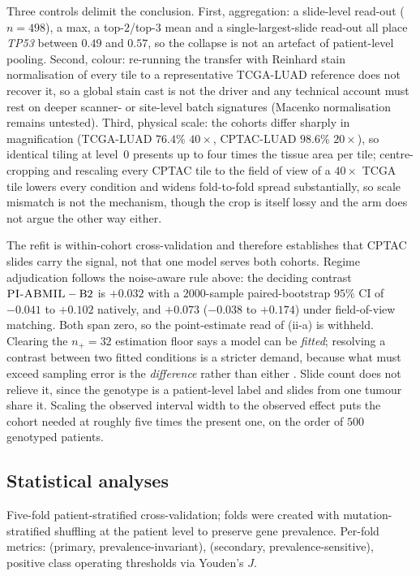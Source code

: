 Three controls delimit the conclusion. First, aggregation: a slide-level
read-out ($n\!=\!498$), a max, a top-$2$/top-$3$ mean and a
single-largest-slide read-out all place \textit{TP53} between $0.49$ and
$0.57$, so the collapse is not an artefact of patient-level pooling.
Second, colour: re-running the transfer with Reinhard stain
normalisation of every tile to a representative TCGA-LUAD reference does
not recover it, so a global stain cast is not the driver and any
technical account must rest on deeper scanner- or site-level batch
signatures\cite{howard2021site} (Macenko normalisation remains untested).
Third, physical scale: the cohorts differ sharply in magnification
(TCGA-LUAD $76.4\%$ $40\times$, CPTAC-LUAD $98.6\%$ $20\times$), so
identical tiling at level~$0$ presents up to four times the tissue area
per tile; centre-cropping and rescaling every CPTAC tile to the field of
view of a $40\times$ TCGA tile lowers every condition and widens
fold-to-fold spread substantially, so scale mismatch is not the
mechanism, though the crop is itself lossy and the arm does not argue the
other way either.

The refit is within-cohort cross-validation and therefore establishes
that CPTAC slides carry the signal, not that one model serves both
cohorts. Regime adjudication follows the noise-aware rule above: the
deciding contrast $\textsc{PI-ABMIL}{}-\mathrm{B2}$ is $+0.032$ with a
$2000$-sample paired-bootstrap $95\%$ CI of $-0.041$ to $+0.102$
natively, and $+0.073$ ($-0.038$ to $+0.174$) under field-of-view
matching. Both span zero, so the point-estimate read of (ii-a) is
withheld. Clearing the $n_+\!=\!32$ estimation floor says a model can be
\emph{fitted}; resolving a contrast between two fitted conditions is a
stricter demand, because what must exceed sampling error is the
\emph{difference} rather than either \auroc{}. Slide count does not
relieve it, since the genotype is a patient-level label and slides from
one tumour share it. Scaling the observed interval width to the observed
effect puts the cohort needed at roughly five times the present one, on
the order of $500$ genotyped patients.

\subsection*{Statistical analyses}

Five-fold patient-stratified cross-validation; folds were
created with mutation-stratified shuffling at the patient level to
preserve gene prevalence.
Per-fold metrics: \auroc{} (primary, prevalence-invariant),
\auprc{} (secondary, prevalence-sensitive),
positive class operating thresholds via Youden's
$J$.

